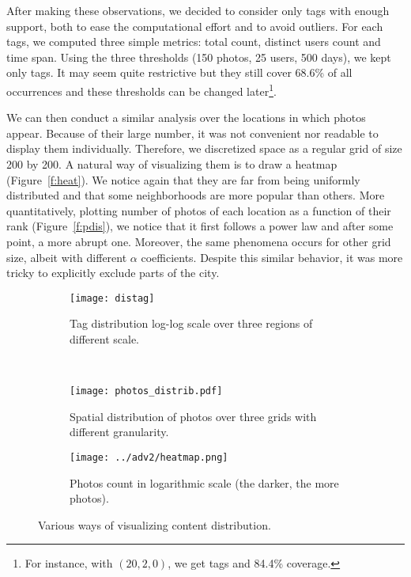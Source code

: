 After making these observations, we decided to consider only tags with enough
support, both to ease the computational effort and to avoid outliers. For each
tags, we computed three simple metrics: total count, distinct users count and
time span. Using the three thresholds (150 photos, 25 users, 500 days), we
kept only  tags. It may seem quite restrictive but they still
cover 68.6\% of all occurrences and these thresholds can be changed
later\footnote{For instance, with $(20, 2, 0)$, we get  tags
and 84.4\% coverage.}.

We can then conduct a similar analysis over the locations in which photos
appear. Because of their large number, it was not convenient nor readable to
display them individually. Therefore, we discretized space as a regular grid
of size 200 by 200. A natural way of visualizing them is to draw a heatmap
(Figure~\vref{f:heat}).  We notice again that they are far from being
uniformly distributed and that some neighborhoods are more popular than
others. More quantitatively, plotting number of photos of each location as a
function of their rank (Figure~\vref{f:pdis}), we notice that it first follows
a power law and after some point, a more abrupt one. Moreover, the same
phenomena occurs for other grid size, albeit with different $\alpha$
coefficients. Despite this similar behavior, it was more tricky to explicitly
exclude parts of the city.

\clearpage
{}
\thispagestyle{empty}
\begin{figure}[p]
        \centering
		\begin{subfigure}[b]{0.5\textwidth}
			\texttt{[image: distag]}
			\caption{Tag distribution log-log scale over three regions of
			different scale.\label{f:tags}}
		\end{subfigure}~
        \begin{subfigure}[b]{0.5\textwidth}
			\texttt{[image: photos\_distrib.pdf]}
			\caption{Spatial distribution of photos over three grids with
			different granularity.\label{f:pdis}}
        \end{subfigure}

		\begin{subfigure}[b]{\textwidth}
			\centering
			\texttt{[image: ../adv2/heatmap.png]}
			\caption{Photos count in logarithmic scale (the darker, the more
			photos).\label{f:heat}}
		\end{subfigure}
		\caption{Various ways of visualizing content distribution.\label{f:distrib}}
\end{figure}
\restoregeometry

